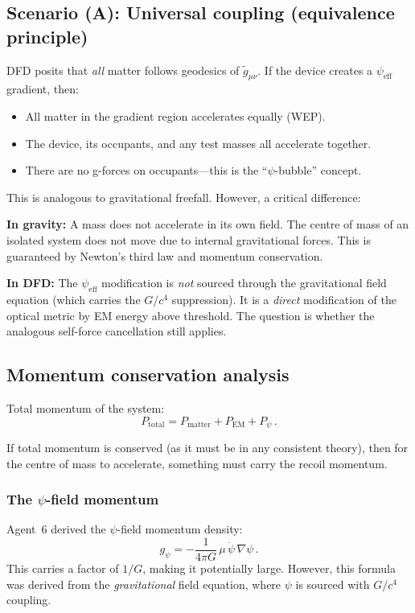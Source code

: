 \documentclass[12pt,a4paper]{article}
\newcommand{\psieff}{\psi_{\mathrm{eff}}}
\begin{document}
\subsection{Scenario (A): Universal coupling (equivalence principle)}

DFD posits that \emph{all} matter follows geodesics of $\tilde{g}_{\mu\nu}$. If the device creates
a $\psieff$ gradient, then:
\begin{itemize}
\item All matter in the gradient region accelerates equally (WEP).
\item The device, its occupants, and any test masses all accelerate together.
\item There are no g-forces on occupants---this is the ``$\psi$-bubble'' concept.
\end{itemize}

This is analogous to gravitational freefall. However, a critical difference:

\textbf{In gravity:} A mass does not accelerate in its own field. The centre of mass of an isolated
system does not move due to internal gravitational forces. This is guaranteed by Newton's third law
and momentum conservation.

\textbf{In DFD:} The $\psieff$ modification is \emph{not} sourced through the gravitational field equation
(which carries the $G/c^4$ suppression). It is a \emph{direct} modification of the optical metric by EM
energy above threshold. The question is whether the analogous self-force cancellation still applies.

\subsection{Momentum conservation analysis}

Total momentum of the system:
\begin{equation}
P_{\mathrm{total}} = P_{\mathrm{matter}} + P_{\mathrm{EM}} + P_\psi\,.
\end{equation}

If total momentum is conserved (as it must be in any consistent theory), then for the centre of mass
to accelerate, something must carry the recoil momentum.

\subsubsection{The $\psi$-field momentum}

Agent~6 derived the $\psi$-field momentum density:
\begin{equation}
g_\psi = -\frac{1}{4\pi G}\,\mu\,\dot\psi\,\nabla\psi\,.
\end{equation}
This carries a factor of $1/G$, making it potentially large. However, this formula was derived from the
\emph{gravitational} field equation, where $\psi$ is sourced with $G/c^4$ coupling.
\end{document}
